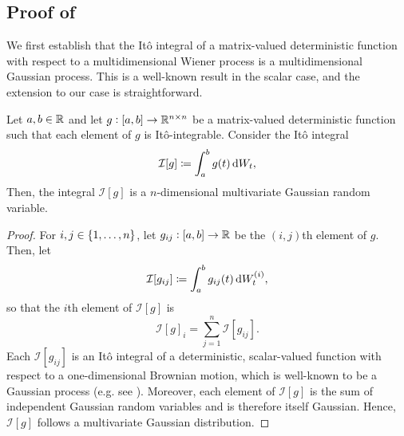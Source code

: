 \subsection{Proof of }\label{app:limit_sol_proof}
We first establish that the It\^o integral of a matrix-valued deterministic function with respect to a multidimensional Wiener process is a multidimensional Gaussian process.
This is a well-known result in the scalar case, and the extension to our case is straightforward.
\begin{lemma}\label{lem:det_gauss}
	Let \(a,b \in \mathbb{R}\) and let \(g: [a,b] \to \mathbb{R}^{n\times n}\) be a matrix-valued deterministic function such that each element of \(g\) is It\^o-integrable.
	Consider the It\^o integral
	\[
		\mathcal{I}[g] \coloneqq \int_{a}^b{g(t)\dif W_t},
	\]
	Then, the integral \(\mathcal{I}[g]\) is a \(n\)-dimensional multivariate Gaussian random variable.
\end{lemma}
\begin{proof}
	For \(i,j \in \set{1,\hdots,n}\), let \(g_{ij}: [a,b] \to \mathbb{R}\) be the \((i,j)\)th element of \(g\).
	Then, let
	\[
		\mathcal{I}[g_{ij}] \coloneqq \int_a^b{g_{ij}(t)\dif W_t^{(i)}},
	\]
	so that the \(i\)th element of \(\mathcal{I}[g]\) is
	\[
		\mathcal{I}[g]_i = \sum_{j = 1}^n{\mathcal{I}\left[g_{ij}\right]}.
	\]
	Each \(\mathcal{I}[g_{ij}]\) is an It\^o integral of a deterministic, scalar-valued function with respect to a one-dimensional Brownian motion, which is well-known to be a Gaussian process (e.g. see \cite[Lem. 4.3.11]{Applebaum_2004_LevyProcessesStochastic}).
	Moreover, each element of \(\mathcal{I}[g]\) is the sum of independent Gaussian random variables and is therefore itself Gaussian.
	Hence, \(\mathcal{I}[g]\) follows a multivariate Gaussian distribution.
\end{proof}

